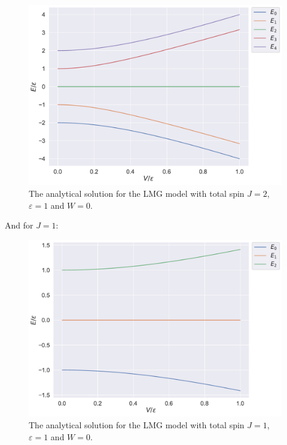 \begin{figure}[H]
    \centering
    \includegraphics[width=\textwidth]{Figures/Plots/Lipkin/J2_true.pdf}
    \caption{The analytical solution for the LMG model with total spin $J=2$, $\varepsilon = 1$ and $W = 0$.}
    \label{fig:J2_true}
\end{figure}

And for $J=1$:

\begin{figure}
    \centering
    \includegraphics[width=\textwidth]{Figures/Plots/Lipkin/J1_true.pdf}
    \caption{The analytical solution for the LMG model with total spin $J=1$, $\varepsilon = 1$ and $W = 0$.}
    \label{fig:J1_true}
\end{figure}





